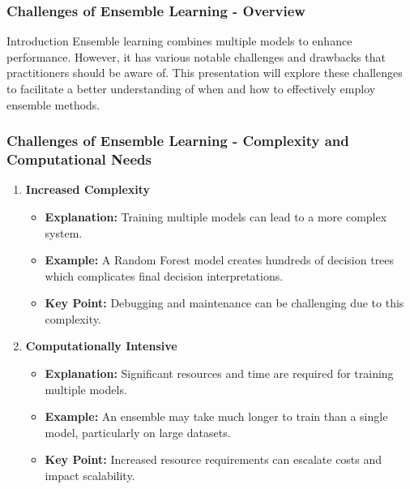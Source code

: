 \documentclass[aspectratio=169]{beamer}
\begin{document}
\begin{frame}[fragile]
    \frametitle{Challenges of Ensemble Learning - Overview}
    \begin{block}{Introduction}
        Ensemble learning combines multiple models to enhance performance. However, it has various notable challenges and drawbacks that practitioners should be aware of. This presentation will explore these challenges to facilitate a better understanding of when and how to effectively employ ensemble methods.
    \end{block}
\end{frame}

\begin{frame}[fragile]
    \frametitle{Challenges of Ensemble Learning - Complexity and Computational Needs}
    \begin{enumerate}
        \item \textbf{Increased Complexity}
            \begin{itemize}
                \item \textbf{Explanation:} Training multiple models can lead to a more complex system.
                \item \textbf{Example:} A Random Forest model creates hundreds of decision trees which complicates final decision interpretations.
                \item \textbf{Key Point:} Debugging and maintenance can be challenging due to this complexity.
            \end{itemize}
        \item \textbf{Computationally Intensive}
            \begin{itemize}
                \item \textbf{Explanation:} Significant resources and time are required for training multiple models.
                \item \textbf{Example:} An ensemble may take much longer to train than a single model, particularly on large datasets.
                \item \textbf{Key Point:} Increased resource requirements can escalate costs and impact scalability.
            \end{itemize}
    \end{enumerate}
\end{frame}
\end{document}
